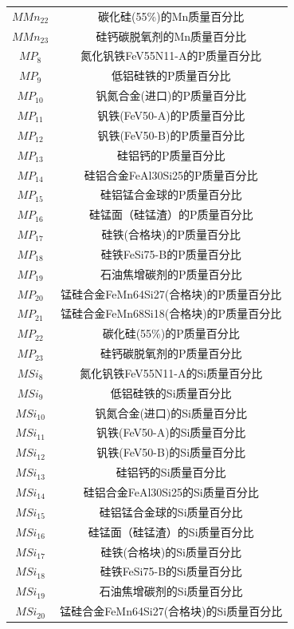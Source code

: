 \documentclass[12pt]{article}%
\begin{document}
\begin{longtable}{|c|c|}
$MMn_{22}$ & 碳化硅(55\%)的Mn质量百分比 \\
$MMn_{23}$ & 硅钙碳脱氧剂的Mn质量百分比 \\\hline
$MP_{8}$ & 氮化钒铁FeV55N11-A的P质量百分比 \\
$MP_{9}$ & 低铝硅铁的P质量百分比 \\
$MP_{10}$ & 钒氮合金(进口)的P质量百分比 \\
$MP_{11}$ & 钒铁(FeV50-A)的P质量百分比 \\
$MP_{12}$ & 钒铁(FeV50-B)的P质量百分比 \\
$MP_{13}$ & 硅铝钙的P质量百分比 \\
$MP_{14}$ & 硅铝合金FeAl30Si25的P质量百分比 \\
$MP_{15}$ & 硅铝锰合金球的P质量百分比 \\
$MP_{16}$ & 硅锰面（硅锰渣）的P质量百分比 \\
$MP_{17}$ & 硅铁(合格块)的P质量百分比 \\
$MP_{18}$ & 硅铁FeSi75-B的P质量百分比 \\
$MP_{19}$ & 石油焦增碳剂的P质量百分比 \\
$MP_{20}$ & 锰硅合金FeMn64Si27(合格块)的P质量百分比 \\
$MP_{21}$ & 锰硅合金FeMn68Si18(合格块)的P质量百分比 \\
$MP_{22}$ & 碳化硅(55\%)的P质量百分比 \\
$MP_{23}$ & 硅钙碳脱氧剂的P质量百分比 \\\hline
$MSi_{8}$ & 氮化钒铁FeV55N11-A的Si质量百分比 \\
$MSi_{9}$ & 低铝硅铁的Si质量百分比 \\
$MSi_{10}$ & 钒氮合金(进口)的Si质量百分比 \\
$MSi_{11}$ & 钒铁(FeV50-A)的Si质量百分比 \\
$MSi_{12}$ & 钒铁(FeV50-B)的Si质量百分比 \\
$MSi_{13}$ & 硅铝钙的Si质量百分比 \\
$MSi_{14}$ & 硅铝合金FeAl30Si25的Si质量百分比 \\
$MSi_{15}$ & 硅铝锰合金球的Si质量百分比 \\
$MSi_{16}$ & 硅锰面（硅锰渣）的Si质量百分比 \\
$MSi_{17}$ & 硅铁(合格块)的Si质量百分比 \\
$MSi_{18}$ & 硅铁FeSi75-B的Si质量百分比 \\
$MSi_{19}$ & 石油焦增碳剂的Si质量百分比 \\
$MSi_{20}$ & 锰硅合金FeMn64Si27(合格块)的Si质量百分比 \\

\end{longtable}
\end{document}
